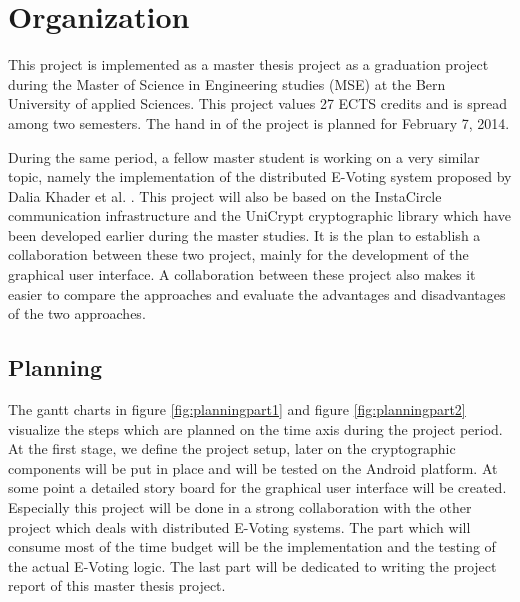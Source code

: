 \documentclass[numbers=noenddot, abstract=on]{scrreprt}
\begin{document}
\chapter{Organization}
\label{cha:organization}
This project is implemented as a master thesis project as a graduation project
during the Master of Science in Engineering studies (MSE) at the Bern University
of applied Sciences. This project values 27 ECTS credits and is spread among two
semesters. The hand in of the project is planned for February 7, 2014.

During the same period, a fellow master student is working on a very similar
topic, namely the implementation of the distributed E-Voting system proposed by
Dalia Khader et al. \cite{HKRS12}. This project will also be based on the
InstaCircle communication infrastructure \cite{ritter13a} and the UniCrypt
cryptographic library \cite{ritter12} which have been developed earlier during
the master studies. It is the plan to establish a collaboration between these
two project, mainly for the development of the graphical user interface. A
collaboration between these project also makes it easier to compare the
approaches and evaluate the advantages and disadvantages of the two approaches.

\section{Planning}
\label{sec:planning}
The gantt charts in figure \ref{fig:planningpart1} and figure
\ref{fig:planningpart2} visualize the steps which are planned on the time axis
during the project period. At the first stage, we define the project setup,
later on the cryptographic components will be put in place and will be tested on the
Android platform. At some point a detailed story board for the graphical user
interface will be created. Especially this project will be done in a strong
collaboration with the other project which deals with distributed E-Voting
systems. The part which will consume most of the time budget will be the
implementation and the testing of the actual E-Voting logic. The last part will
be dedicated to writing the project report of this master thesis project.
\end{document}
